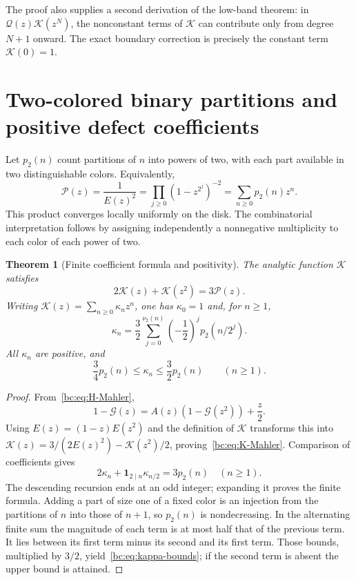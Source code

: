 \documentclass[11pt,a4paper,oneside,openany]{book}
\numberwithin{equation}{chapter}
\newtheorem{theorem}{Theorem}[chapter]
\theoremstyle{definition}
\theoremstyle{remark}
\newcommand{\vnu}{\nu_2}
\begin{document}
The proof also supplies a second derivation of the low-band theorem: in
$\mathcal Q(z)\mathcal K(z^N)$, the nonconstant terms of $\mathcal K$ can contribute only from degree $N+1$
onward. The exact boundary correction is precisely the constant term $\mathcal K(0)=1$.

\section{Two-colored binary partitions and positive defect coefficients}
Let $p_2(n)$ count partitions of $n$ into powers of two, with each part available
in two distinguishable colors. Equivalently,
\begin{equation}
 \mathcal P(z)=\frac1{E(z)^2}
 =\prod_{j\ge0}(1-z^{2^j})^{-2}
 =\sum_{n\ge0}p_2(n)z^n.
 \label{bc:eq:binary-partitions}
\end{equation}
This product converges locally uniformly on the disk. The combinatorial
interpretation follows by assigning independently a nonnegative multiplicity to
each color of each power of two.

\begin{theorem}[Finite coefficient formula and positivity]
\label{bc:thm:K-coeff}
The analytic function $\mathcal K$ satisfies
\begin{equation}
 2\mathcal K(z)+\mathcal K(z^2)=3\mathcal P(z).
 \label{bc:eq:K-Mahler}
\end{equation}
Writing $\mathcal K(z)=\sum_{n\ge0}\kappa_nz^n$, one has $\kappa_0=1$ and, for $n\ge1$,
\begin{equation}
 \boxed{\quad
 \kappa_n=\frac32\sum_{j=0}^{\vnu(n)}
       \left(-\frac12\right)^j p_2(n/2^j).
 \quad}
 \label{bc:eq:kappa-finite}
\end{equation}
All $\kappa_n$ are positive, and
\begin{equation}
 \frac34p_2(n)\le\kappa_n\le\frac32p_2(n)\qquad(n\ge1).
 \label{bc:eq:kappa-bounds}
\end{equation}
\end{theorem}
\begin{proof}
From~\eqref{bc:eq:H-Mahler},
\[
 1-\mathcal G(z)=A(z)(1-\mathcal G(z^2))+\frac z2.
\]
Using $E(z)=(1-z)E(z^2)$ and the definition of $\mathcal K$ transforms this into
$\mathcal K(z)=3/(2E(z)^2)-\mathcal K(z^2)/2$, proving~\eqref{bc:eq:K-Mahler}.
Comparison of coefficients gives
\[
 2\kappa_n+\mathbf1_{2\mid n}\kappa_{n/2}=3p_2(n)\quad(n\ge1).
\]
The descending recursion ends at an odd integer; expanding it proves the finite
formula. Adding a part of size one of a fixed color is an injection from the
partitions of $n$ into those of $n+1$, so $p_2(n)$ is nondecreasing. In the
alternating finite sum the magnitude of each term is at most half that of the
previous term. It lies between its first term minus its second and its first
term. Those bounds, multiplied by $3/2$, yield~\eqref{bc:eq:kappa-bounds}; if the
second term is absent the upper bound is attained.
\end{proof}
\end{document}
